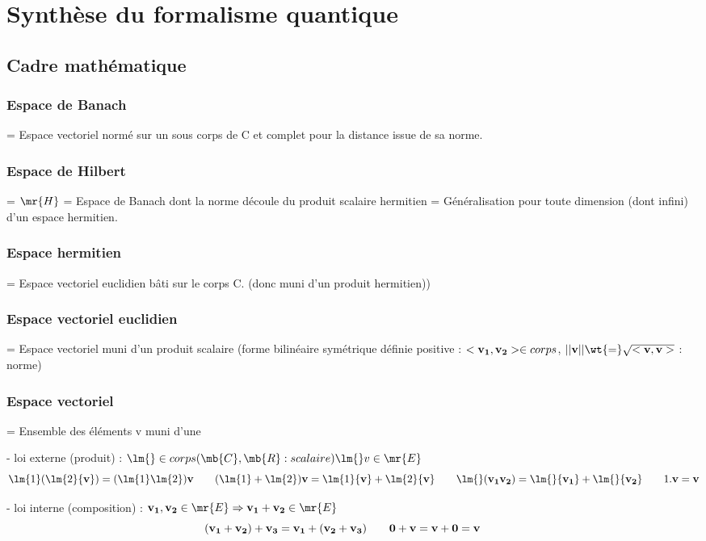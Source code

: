 \section{Synthèse du formalisme quantique}
\subsection{Cadre mathématique}
\subsubsection{Espace de Banach}
 = Espace vectoriel normé sur un sous corps de C et complet
 pour la distance issue de sa norme.

\subsubsection{Espace de Hilbert} = $\mr{H}$ = Espace de Banach dont la norme découle du produit scalaire
 hermitien = Généralisation pour toute dimension (dont infini) d'un espace
 hermitien.

\subsubsection{Espace hermitien} = Espace vectoriel euclidien bâti sur le corps C. (donc muni
 d'un produit hermitien)) 

\subsubsection{Espace vectoriel euclidien} = Espace vectoriel muni d'un produit scalaire
 (forme bilinéaire symétrique définie positive : $<{\bf v_1},{\bf v_2}>\in corps$,
 $||{\bf v}|| \wt{=} \sqrt{<{\bf v},{\bf v}>}$ : norme)

\subsubsection{Espace vectoriel} = Ensemble des éléments v muni d'une

 - loi externe (produit) : $\lm{}\in corps (\mb{C}, \mb{R} : scalaire)\lm{} v
 \in \mr{E}$
\[
\lm{1}(\lm{2}{\bf v}) = (\lm{1}\lm{2}){\bf v} \qquad
(\lm{1}+\lm{2}){\bf v} = \lm{1}{\bf v}+\lm{2}{\bf v} \qquad
\lm{}({\bf v_1}{\bf v_2}) = \lm{}{\bf v_1} + \lm{}{\bf v_2} \qquad
1.{\bf v} = {\bf v}
\]

 - loi interne (composition) : ${\bf v_1}, {\bf v_2} \in \mr{E} \Rightarrow
  {\bf v_1}+{\bf v_2} \in \mr{E}$
\[
\bf{(v_1+v_2)+v_3 = v_1+(v_2+v_3) \qquad 0+v=v+0=v} \qquad
\]

